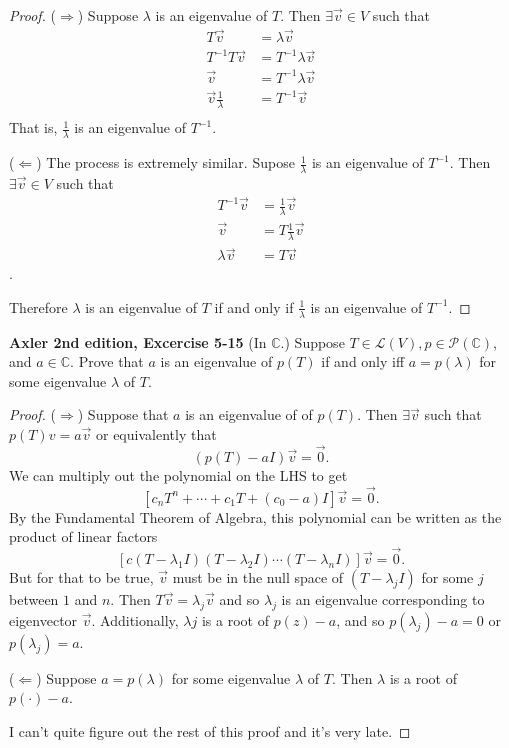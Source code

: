\documentclass{article}
\newcommand{\brac}[1]{\left[ #1 \right]}
\newcommand{\paren}[1]{\left( #1 \right)}
\begin{document}
\begin{proof}
    ($\Longrightarrow$) Suppose $\lambda$ is an eigenvalue of $T$. Then $\exists \vec v \in V$ such that \begin{align*}
        T \vec{v} &= \lambda \vec{v} \\
        T^{-1} T \vec{v} &= T^{-1} \lambda \vec{v} \\
        \vec{v} &= T^{-1} \lambda \vec{v} \\
        \vec{v} \frac{1}{\lambda} &= T^{-1}\vec{v} \\
    \end{align*}
    That is, $\frac{1}{\lambda}$ is an eigenvalue of $T^{-1}$.

    ($\Longleftarrow$) The process is extremely similar. Supose $\frac{1}{\lambda}$ is an eigenvalue of $T^{-1}$. Then $\exists \vec v \in V$ such that \begin{align*}
        T^{-1} \vec{v} &= \frac{1}{\lambda} \vec v \\
        \vec{v} &= T \frac{1}{\lambda} \vec v \\
        \lambda \vec{v} &= T \vec v
    \end{align*}.

    Therefore $\lambda$ is an eigenvalue of $T$ if and only if $\frac{1}{\lambda}$ is an eigenvalue of $T^{-1}$.    
\end{proof}



\textbf{Axler 2nd edition, Excercise 5-15}
(In $\mathbb{C}$.) Suppose $T \in \mathcal{L} (V), p \in \mathcal{P}(\mathbb{C})$, and $a \in \mathbb C$. Prove that $a$ is an eigenvalue of $p(T)$ if and only iff $a = p(\lambda)$ for some eigenvalue $\lambda$ of $T$.

\begin{proof}
($\Longrightarrow$) Suppose that $a$ is an eigenvalue of of $p(T)$. Then $\exists \vec v$ such that $p(T)v = a \vec v$ or equivalently that
$$\paren{p(T) - aI}\vec v = \vec 0.$$
We can multiply out the polynomial on the LHS to get 
$$\brac{c_n T^n + \cdots + c_1 T + (c_0 - a)I}\vec v = \vec 0.$$
By the Fundamental Theorem of Algebra, this polynomial can be written as the product of linear factors
$$\brac{c(T - \lambda_1I)(T - \lambda_2I) \cdots (T - \lambda_nI) }\vec v = \vec 0.$$
But for that to be true, $\vec v$ must be in the null space of $(T - \lambda_jI)$ for some $j$ between $1$ and $n$. Then $T \vec v = \lambda_j \vec v$ and so $\lambda_j$ is an eigenvalue corresponding to eigenvector $\vec v$. Additionally, $\lambda j$ is a root of $p(z) - a$, and so $p(\lambda_j) - a = 0$ or $p(\lambda_j) = a$.

($\Longleftarrow$) Suppose $a = p(\lambda)$ for some eigenvalue $\lambda$ of $T$. Then $\lambda$ is a root of $p(\cdot) - a$.

I can't quite figure out the rest of this proof and it's very late.
\end{proof}
\end{document}
